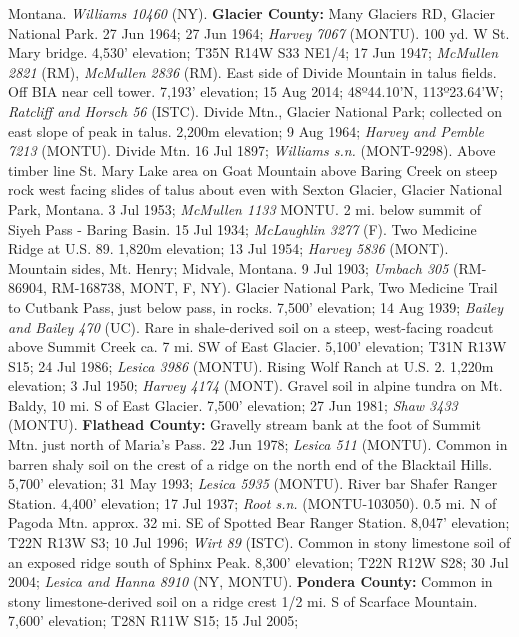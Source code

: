 Montana. \textit{Williams 10460} (NY).
  \textbf{Glacier County:}
Many Glaciers RD, Glacier National Park. 27 Jun 1964; 27 Jun 1964;
\textit{Harvey 7067} (MONTU).
100 yd. W St. Mary bridge. 4,530' elevation; T35N R14W S33 NE1/4;
17 Jun 1947; \textit{McMullen 2821} (RM), \textit{McMullen 2836} (RM).
East side of Divide Mountain in talus fields. Off BIA near cell tower.
7,193' elevation; 15 Aug 2014; 48º44.10'N, 113º23.64'W;
\textit{Ratcliff and Horsch 56} (ISTC).
Divide Mtn., Glacier National Park; collected on east slope of peak in talus.
2,200m elevation; 9 Aug 1964; \textit{Harvey and Pemble 7213} (MONTU).
Divide Mtn. 16 Jul 1897; \textit{Williams s.n.} (MONT-9298).
Above timber line St. Mary Lake area on Goat Mountain above Baring Creek on
steep rock west facing slides of talus about even with Sexton Glacier,
Glacier National Park, Montana. 3 Jul 1953; \textit{McMullen 1133} MONTU.
2 mi. below summit of Siyeh Pass - Baring Basin. 15 Jul 1934;
\textit{McLaughlin 3277} (F).
Two Medicine Ridge at U.S. 89. 1,820m elevation; 13 Jul 1954;
\textit{Harvey 5836} (MONT).
Mountain sides, Mt. Henry; Midvale, Montana. 9 Jul 1903;
\textit{Umbach 305} (RM-86904, RM-168738, MONT, F, NY).
Glacier National Park, Two Medicine Trail to Cutbank Pass, just below pass, in
rocks. 7,500' elevation; 14 Aug 1939; \textit{Bailey and Bailey 470} (UC).
Rare in shale-derived soil on a steep, west-facing roadcut above Summit Creek
ca. 7 mi. SW of East Glacier. 5,100' elevation; T31N R13W S15; 24 Jul 1986;
\textit{Lesica 3986} (MONTU).
Rising Wolf Ranch at U.S. 2. 1,220m elevation; 3 Jul 1950;
\textit{Harvey 4174} (MONT).
Gravel soil in alpine tundra on Mt. Baldy, 10 mi. S of East Glacier.
7,500' elevation; 27 Jun 1981; \textit{Shaw 3433} (MONTU).
  \textbf{Flathead County:}
Gravelly stream bank at the foot of Summit Mtn. just north of Maria's Pass.
22 Jun 1978; \textit{Lesica 511} (MONTU).
Common in barren shaly soil on the crest of a ridge on the north end of the
Blacktail Hills. 5,700' elevation; 31 May 1993; \textit{Lesica 5935} (MONTU).
River bar Shafer Ranger Station. 4,400' elevation; 17 Jul 1937;
\textit{Root s.n.} (MONTU-103050).
0.5 mi. N of Pagoda Mtn. approx. 32 mi. SE of Spotted Bear Ranger Station.
8,047' elevation; T22N R13W S3; 10 Jul 1996; \textit{Wirt 89} (ISTC).
Common in stony limestone soil of an exposed ridge south of Sphinx Peak.
8,300' elevation; T22N R12W S28; 30 Jul 2004;
\textit{Lesica and Hanna 8910} (NY, MONTU).
  \textbf{Pondera County:}
Common in stony limestone-derived soil on a ridge crest 1/2 mi. S of Scarface
Mountain. 7,600' elevation; T28N R11W S15; 15 Jul 2005;
